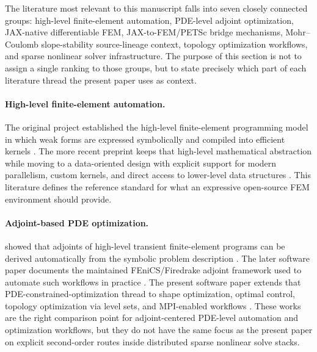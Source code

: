 \label{sec:related}

The literature most relevant to this manuscript falls into seven closely connected
groups: high-level finite-element automation, PDE-level adjoint optimization,
JAX-native differentiable FEM, JAX-to-FEM/PETSc bridge mechanisms,
Mohr--Coulomb slope-stability source-lineage context, topology optimization
workflows, and sparse nonlinear solver infrastructure. The purpose of this
section is not to assign a single ranking to those groups, but to state precisely
which part of each literature thread the present paper uses as context.

\paragraph{High-level finite-element automation.}
The original \fenics{} project established the high-level finite-element
programming model in which weak forms are expressed symbolically and compiled
into efficient kernels \citep{logg2012fenicsbook}. The more recent
 preprint keeps that high-level mathematical abstraction while
moving to a data-oriented design with explicit support for modern parallelism,
custom kernels, and direct access to lower-level data structures
\citep{baratta2025dolfinx}. This literature defines the reference standard for
what an expressive open-source FEM environment should provide.

\paragraph{Adjoint-based PDE optimization.}
 showed that adjoints of high-level transient finite-element
programs can be derived automatically from the symbolic problem description
\citep{farrell2013dolfinadjoint}. The later  software paper
documents the maintained FEniCS/Firedrake adjoint framework used to automate
such workflows in practice \citep{mitusch2019pyadjoint}. The present
 software paper extends that PDE-constrained-optimization thread
to shape optimization, optimal control, topology optimization via level sets,
and MPI-enabled workflows \citep{blauth2023cashocsv2}. These works are the
right comparison point for adjoint-centered PDE-level automation and
optimization workflows, but they do not have the same focus as the present
paper on explicit second-order routes inside distributed sparse nonlinear solve
stacks.

